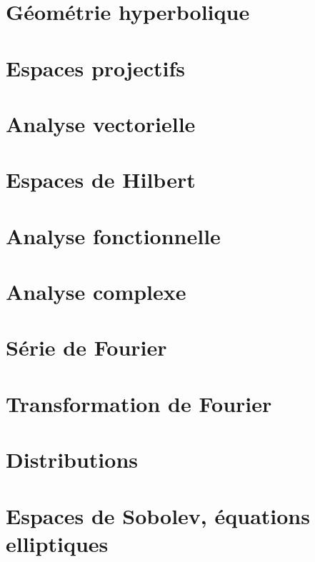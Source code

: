 \chapter{Géométrie hyperbolique}


\chapter{Espaces projectifs}




\chapter{Analyse vectorielle}


\chapter{Espaces de Hilbert}


\chapter{Analyse fonctionnelle}



\chapter{Analyse complexe}          \label{ChapICHIooXbLccl}



\chapter{Série de Fourier}


\chapter{Transformation de Fourier}


\chapter{Distributions}


\chapter{Espaces de Sobolev, équations elliptiques}      \label{CHAPooVTIIooGOEvXT}



